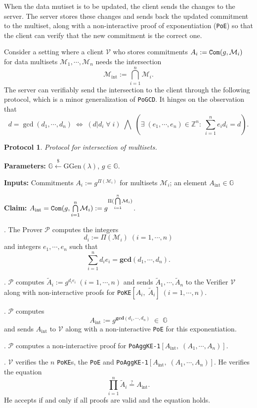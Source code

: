 \documentclass[11pt, lettersize, notitlepage, leqno, footskip=0.6cm]{article}
\newcommand{\bz}{\mathbb Z}
\newcommand{\pl}{\prod\limits}
\newcommand{\LRA}{\Longleftrightarrow}
\newcommand{\wti}{\widetilde}
\newcommand{\mc}{\mathcal}
\newcommand{\mb}{\mathbb}
\newcommand{\mbf}{\mathbf}
\newcommand{\mr}{\mathrm}
\newcommand{\lamb}{\lambda}
\newcommand{\mP}{\mc{P}}
\newcommand{\V}{\mc{V}}
\newcommand{\vs}{\vspace{-0.15cm}}
\newcommand{\noin}{\noindent}
\newcommand{\sta}{\stackrel{?}{=}}
\newcommand{\GCD}{\mbf{gcd}}
\newtheorem{Prot}[Thm]{Protocol}
\numberwithin{equation}{section}
\begin{document}
When the data mutiset is to be updated, the client sends the changes to the server. The server stores these changes and sends back the updated commitment to the multiset, along with a non-interactive proof of exponentiation (\verb|PoE|) so that the client can verify that the new commitment is the correct one. 

Consider a setting where a client $\mc{V}$ who stores commitments $A_i:= \protect{\verb|Com|}(g, \mc{M}_i)$ for data multisets $\mc{M}_1, \cdots, \mc{M}_n$ needs the intersection \vs $$\mc{M}_{\mr{int}}:=\bigcap\limits_{i=1}^n \mc{M}_i .$$ The server can verifiably send the intersection to the client through the following protocol, which is a minor generalization of \verb|PoGCD|. It hinges on the observation that \vs $$d = \gcd(d_1,\cdots,d_n)\; \LRA\; (d|d_i\;\forall\;i)\;\bigwedge\; (\exists\;(e_1,\cdots,e_n)\in\bz^n:\;\sum\limits_{i=1}^n e_id_i = d ).$$

\vspace{0.1cm}

\begin{Prot} Protocol for intersection of multisets.\end{Prot} \vspace{-0.3cm}

\noin \textbf{Parameters:} $\mb{G}\xleftarrow{\$} \mr{GGen}(\lamb)$,\; $g\in \mb{G}$.

\noin \textbf{Inputs:} Commitments $A_i := g^{\Pi(\mc{M}_i)}$ for multisets $\mc{M}_i$; an element $A_{\mr{int}}\in\mb{G}$

\noin \textbf{Claim:} $A_{\mr{int}} = \protect{\verb|Com|}(g, {\bigcap\limits_{i=1}^n} \mc{M}_i) := g^{\Pi({\bigcap\limits_{i=1}^n} \mc{M}_i)}$.

\begin{prf1} \normalfont \noin 1. The Prover $\mP$ computes the integers \vs $$d_i:= \Pi(\mc{M}_i)\; (i=1,\cdots,n)$$ and integers $e_1,\cdots,e_n$ such that \vs $$\sum\limits_{i=1}^n d_ie_i = \GCD(d_1,\cdots,d_n).$$

\noin 2. $\mP$ computes $\wti{A}_i:= g^{d_ie_i} \; (i=1,\cdots,n)$ and sends $\wti{A}_1,\cdots, \wti{A}_n$ to the Verifier $\V$ along with non-interactive proofs for \verb|PoKE|$[A_i,\;\wti{A}_i]\; (i=1,\cdots,n)$.

\noin 3. $\mP$ computes \vs $$A_{\mr{int}}:= g^{\GCD(d_1,\cdots,d_n)}\;\in\; \mb{G}$$ and sends $A_{\mr{int}}$ to $\V$ along with a non-interactive \verb|PoE| for this exponentiation.

\noin 4. $\mP$ computes a non-interactive proof for \verb|PoAggKE-1|$[A_{\mr{int}},\;(A_1,\cdots,A_n)]$.

\noin 5. $\V$ verifies the $n$ \verb|PoKE|s, the  \verb|PoE| and \verb|PoAggKE-1|$[A_{\mr{int}},\;(A_1,\cdots,A_n)]$. He verifies the equation \vs $$\pl_{i=1}^n \wti{A}_i\sta A_{\mr{int}}.$$ He accepts if and only if all proofs are valid and the equation holds.\end{prf1}
\end{document}
